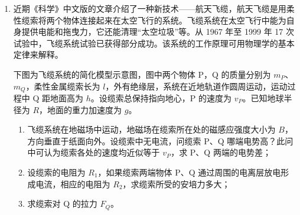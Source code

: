 \documentclass[\gkver]{gaokaozhenti}
\begin{document}
\begin{enumerate}
{（2）设卡车刹车前速度为 $v_{0}$，轮胎与雪地之间的动摩擦因数为 $\mu$。两车相撞前卡车动能变化 $\frac{1}{2}Mv_{0}^{2}-\frac{1}{2}Mv_{1}^{2}=\mu MgL$，碰撞后两车共同向前滑动，动能变化 $\frac{1}{2}(M+m)v_{2}^{2}-0=\mu(M+m)gl$。由以上两式得 $v_{0}^{2}-v_{1}^{2}=2\mu gL$，$v_{2}^{2}=2\mu gl$，又 $l=\frac{8}{25}L$，得 $v_{0}^{2}=3\mu gL$。如果卡车滑到故障车前就停止，由 $\frac{1}{2}Mv_{0}^{2}-0=\mu MgL'$，故 $L'=\frac{3}{2}L$。这意味着卡车司机在距故障车至少 $\frac{3}{2}L$ 处紧急刹车，事故就能够免于发生。
}

\item
近期《科学》中文版的文章介绍了一种新技术——航天飞缆，航天飞缆是用柔性缆索将两个物体连接起来在太空飞行的系统。飞缆系统在太空飞行中能为自身提供电能和拖曳力，它还能清理“太空垃圾”等。从 1967 年至 1999 年 17 次试验中，飞缆系统试验已获得部分成功。该系统的工作原理可用物理学的基本定律来解释。

下图为飞缆系统的简化模型示意图，图中两个物体 P，Q 的质量分别为 $m_{P}$、$m_{Q}$，柔性金属缆索长为 $l$，外有绝缘层，系统在近地轨道作圆周运动，运动过程中 Q 距地面高为 $h$。设缆索总保持指向地心，P 的速度为 $v_{P}$。已知地球半径为 $R$，地面的重力加速度为 $g$。
\begin{enumerate}
	\item
	飞缆系统在地磁场中运动，地磁场在缆索所在处的磁感应强度大小为 $B$，方向垂直于纸面向外。设缆索中无电流，问缆索 P、Q 哪端电势高？此问中可认为缆索各处的速度均近似等于 $v_{P}$，求 P、Q 两端的电势差；
	\item
	设缆索的电阻为 $R_{1}$，如果缆索两端物体 P、Q 通过周围的电离层放电形成电流，相应的电阻为 $R_{2}$，求缆索所受的安培力多大；
	\item
	求缆索对 Q 的拉力 $F_{Q}$。
\end{enumerate}

\end{enumerate}
\end{document}
